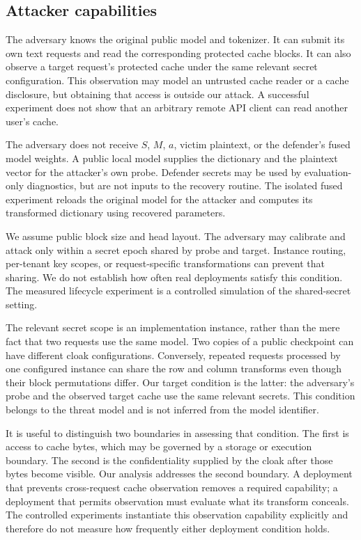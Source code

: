 \subsection{Attacker capabilities}
The adversary knows the original public model and tokenizer. It can submit its own text requests and read the corresponding protected cache blocks. It can also observe a target request's protected cache under the same relevant secret configuration. This observation may model an untrusted cache reader or a cache disclosure, but obtaining that access is outside our attack. A successful experiment does not show that an arbitrary remote API client can read another user's cache.

The adversary does not receive $S$, $M$, $a$, victim plaintext, or the defender's fused model weights. A public local model supplies the dictionary and the plaintext vector for the attacker's own probe. Defender secrets may be used by evaluation-only diagnostics, but are not inputs to the recovery routine. The isolated fused experiment reloads the original model for the attacker and computes its transformed dictionary using recovered parameters.

We assume public block size and head layout. The adversary may calibrate and attack only within a secret epoch shared by probe and target. Instance routing, per-tenant key scopes, or request-specific transformations can prevent that sharing. We do not establish how often real deployments satisfy this condition. The measured lifecycle experiment is a controlled simulation of the shared-secret setting.

The relevant secret scope is an implementation instance, rather than the mere fact that two requests use the same model. Two copies of a public checkpoint can have different cloak configurations. Conversely, repeated requests processed by one configured instance can share the row and column transforms even though their block permutations differ. Our target condition is the latter: the adversary's probe and the observed target cache use the same relevant secrets. This condition belongs to the threat model and is not inferred from the model identifier.

It is useful to distinguish two boundaries in assessing that condition. The first is access to cache bytes, which may be governed by a storage or execution boundary. The second is the confidentiality supplied by the cloak after those bytes become visible. Our analysis addresses the second boundary. A deployment that prevents cross-request cache observation removes a required capability; a deployment that permits observation must evaluate what its transform conceals. The controlled experiments instantiate this observation capability explicitly and therefore do not measure how frequently either deployment condition holds.

